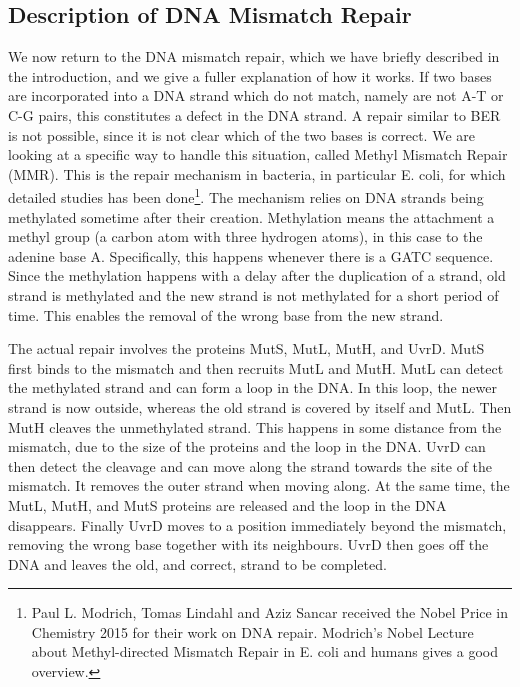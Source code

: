 ﻿
\subsection{Description of DNA Mismatch Repair}

We now return to the DNA mismatch repair, which we have briefly described in the introduction, and we give a fuller explanation of how it works.
If two bases are incorporated into a DNA strand which do not match, namely are not A-T or C-G pairs, this constitutes a defect in the DNA strand. A repair similar to BER is not possible, since it is not clear which of the two bases is correct.
We are looking at a specific way to handle this situation, called Methyl Mismatch Repair (MMR). This is the repair mechanism in bacteria, in particular E.\! coli, for which detailed studies has been done\footnote{Paul L. Modrich, Tomas Lindahl and Aziz Sancar received the Nobel Price in Chemistry 2015 for their work on DNA repair. Modrich's Nobel Lecture about Methyl-directed Mismatch Repair in E. coli and humans \cite{pmid27198632} gives a good overview.}.
The mechanism relies on DNA strands being methylated sometime after their creation. Methylation means the attachment a methyl group (a carbon atom with three hydrogen atoms), in this case to the adenine base A. Specifically, this happens whenever there is a GATC sequence. Since the methylation %
happens with a delay after the duplication of a strand, old strand is methylated and the new strand is not methylated for a short period of time. This enables the removal of the wrong base from the new strand.

The actual repair involves the proteins MutS, MutL, MutH, and UvrD. MutS first binds to the mismatch and then recruits MutL and MutH. MutL can detect the methylated strand and can form a loop in the DNA. In this loop, the newer strand is now outside, whereas the old strand is covered by itself and MutL. Then MutH cleaves the unmethylated strand. This happens in some distance from the mismatch, due to the size of the proteins and the loop in the DNA. UvrD can then detect the cleavage and can move along the strand towards the site of the mismatch. It removes the outer strand when moving along. At the same time, the MutL, MutH, and MutS proteins are released and the loop in the DNA disappears. Finally UvrD moves to a position immediately beyond the mismatch, removing the wrong base together with its neighbours. UvrD then goes off the DNA and leaves the old, and correct, strand to be completed.

